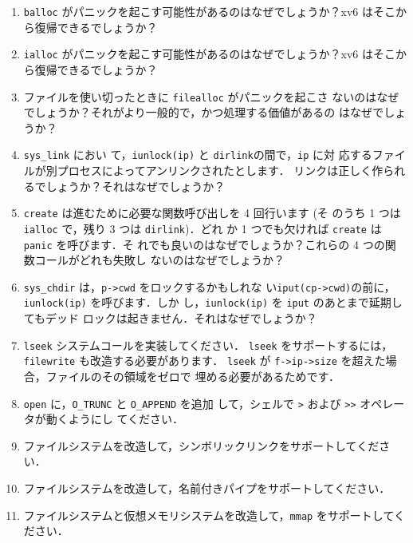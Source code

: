 \begin{enumerate}

\item \texttt{balloc} がパニックを起こす可能性があるのはなぜでしょうか？xv6 はそこから復帰できるでしょうか？

\item \texttt{ialloc} がパニックを起こす可能性があるのはなぜでしょうか？xv6 はそこから復帰できるでしょうか？

\item ファイルを使い切ったときに \texttt{filealloc} がパニックを起こさ
  ないのはなぜでしょうか？それがより一般的で，かつ処理する価値があるの
  はなぜでしょうか？

\item \texttt{sys\_link} におい
  て，\texttt{iunlock(ip)} と \texttt{dirlink}の間で，\texttt{ip} に対
  応するファイルが別プロセスによってアンリンクされたとします．
  リンクは正しく作られるでしょうか？それはなぜでしょうか？

\item \texttt{create} は進むために必要な関数呼び出しを 4 回行います (そ
  のうち 1 つは \texttt{ialloc} で，残り 3 つは \texttt{dirlink})．どれ
  か 1 つでも欠ければ \texttt{create} は \texttt{panic} を呼びます．そ
  れでも良いのはなぜでしょうか？これらの 4 つの関数コールがどれも失敗し
  ないのはなぜでしょうか？

\item \texttt{sys\_chdir} は，\texttt{p->cwd} をロックするかもしれな
  い\texttt{iput(cp->cwd)}の前に，\texttt{iunlock(ip)} を呼びます．しか
  し，\texttt{iunlock(ip)} を \texttt{iput} のあとまで延期してもデッド
  ロックは起きません．それはなぜでしょうか？

\item \texttt{lseek} システムコールを実装してください．
  \texttt{lseek} をサポートするには，\texttt{filewrite} も改造する必要があります．
  \texttt{lseek} が \texttt{f->ip->size} を超えた場合，ファイルのその領域をゼロで
  埋める必要があるためです．

\item \texttt{open} に，\texttt{O\_TRUNC} と \texttt{O\_APPEND} を追加
  して，シェルで \texttt{>} および \texttt{>>} オペレータが動くようにし
  てください．

\item ファイルシステムを改造して，シンボリックリンクをサポートしてください．

\item ファイルシステムを改造して，名前付きパイプをサポートしてください．

\item ファイルシステムと仮想メモリシステムを改造して，\texttt{mmap} をサポートしてください．

\end{enumerate}
